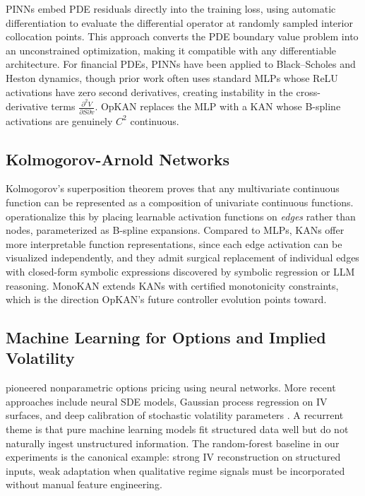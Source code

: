 \documentclass[11pt,a4paper]{article}
\begin{document}
PINNs \citep{raissi2019physics} embed PDE residuals directly into the training loss, using automatic differentiation to evaluate the differential operator at randomly sampled interior collocation points. This approach converts the PDE boundary value problem into an unconstrained optimization, making it compatible with any differentiable architecture. For financial PDEs, PINNs have been applied to Black--Scholes \citep{horvath2021deep} and Heston dynamics, though prior work often uses standard MLPs whose ReLU activations have zero second derivatives, creating instability in the cross-derivative terms $\frac{\partial^2 V}{\partial S \partial v}$. OpKAN replaces the MLP with a KAN whose B-spline activations are genuinely $C^2$ continuous.

\subsection{Kolmogorov-Arnold Networks}

Kolmogorov's superposition theorem \citep{kolmogorov1957representation} proves that any multivariate continuous function can be represented as a composition of univariate continuous functions. \citet{liu_etal_2024_kan} operationalize this by placing learnable activation functions on \emph{edges} rather than nodes, parameterized as B-spline expansions. Compared to MLPs, KANs offer more interpretable function representations, since each edge activation can be visualized independently, and they admit surgical replacement of individual edges with closed-form symbolic expressions discovered by symbolic regression or LLM reasoning. MonoKAN \citep{polo_molina_etal_2024_monokan} extends KANs with certified monotonicity constraints, which is the direction OpKAN's future controller evolution points toward.

\subsection{Machine Learning for Options and Implied Volatility}

\citet{hutchinson_lo_poggio_1994} pioneered nonparametric options pricing using neural networks. More recent approaches include neural SDE models, Gaussian process regression on IV surfaces, and deep calibration of stochastic volatility parameters \citep{hernandez2016model}. A recurrent theme is that pure machine learning models fit structured data well but do not naturally ingest unstructured information. The random-forest baseline in our experiments is the canonical example: strong IV reconstruction on structured inputs, weak adaptation when qualitative regime signals must be incorporated without manual feature engineering.
\end{document}

